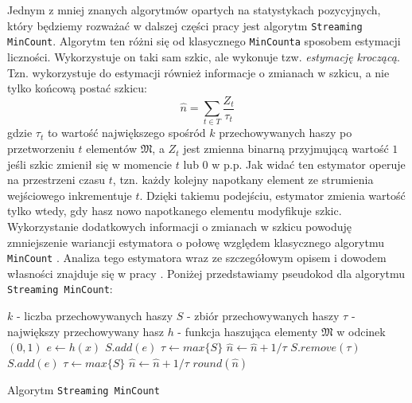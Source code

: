 Jednym z mniej znanych algorytmów opartych na statystykach pozycyjnych, który będziemy rozważać w dalszej części pracy jest algorytm \texttt{Streaming MinCount}. Algorytm ten różni się od klasycznego \texttt{MinCounta} sposobem estymacji liczności. Wykorzystuje on taki sam szkic, ale wykonuje tzw. \textit{estymację kroczącą}. Tzn. wykorzystuje do estymacji również informacje o zmianach w szkicu, a nie tylko końcową postać szkicu:
\begin{equation}
    \hat{n} = \sum_{t \in T} \frac{Z_t}{\tau_{t}}
\end{equation}
gdzie $\tau_{t}$ to wartość największego spośród $k$ przechowywanych haszy po przetworzeniu $t$ elementów $\mathfrak{M}$, a $Z_t$ jest zmienna binarną przyjmującą wartość $1$ jeśli szkic zmienił się w momencie $t$ lub $0$ w p.p. Jak widać ten estymator operuje na przestrzeni czasu $t$, tzn. każdy kolejny napotkany element ze strumienia wejściowego inkrementuje $t$. Dzięki takiemu podejściu, estymator zmienia wartość tylko wtedy, gdy hasz nowo napotkanego elementu modyfikuje szkic. Wykorzystanie dodatkowych informacji o zmianach w szkicu powoduję zmniejszenie wariancji estymatora o połowę względem klasycznego algorytmu \texttt{MinCount} \cite{ting}. Analiza tego estymatora wraz ze szczegółowym opisem i dowodem własności znajduje się w pracy \cite{streamed}. Poniżej przedstawiamy 
pseudokod dla algorytmu \texttt{Streaming MinCount}:
\newline
\begin{algorithm}
    \begin{algorithmic}
    \State $k $ - liczba przechowywanych haszy 
    \State $S  $ - zbiór przechowywanych haszy
    \State $\tau  $ - największy przechowywany hasz 
    \State $h  $ - funkcja haszująca elementy $\mathfrak{M}$ w odcinek $(0, 1)$
    \newline
        \State $e \gets h(x)$
                \State $S.add(e)$
                \State $\tau \gets max\{S\}$
                \State $\hat{n} \gets \hat{n} + 1/\tau$
                \State $S.remove(\tau)$
                \State $S.add(e)$
                \State $\tau \gets max\{S\}$
                \State $\hat{n} \gets \hat{n} + 1/\tau$
            \EndIf
        \EndIf
    \EndFunction
    \newline
        \State \Return $round(\hat{n})$
    \EndFunction
    
    \end{algorithmic}
    \caption{Algorytm \texttt{Streaming MinCount}}
\end{algorithm}


